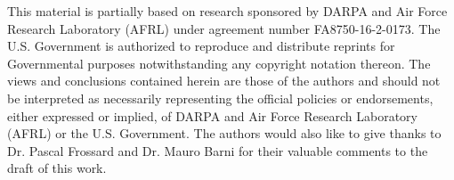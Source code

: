 \documentclass[preprint,12pt]{elsarticle}
\begin{document}
This material is partially based on research sponsored by DARPA and Air
Force Research Laboratory (AFRL) under agreement number
FA8750-16-2-0173. The U.S. Government is authorized to reproduce and
distribute reprints for Governmental purposes notwithstanding any
copyright notation thereon.  The views and conclusions contained herein
are those of the authors and should not be interpreted as necessarily
representing the official policies or endorsements, either expressed or
implied, of DARPA and Air Force Research Laboratory (AFRL) or the U.S.
Government. The authors would also like to give thanks to Dr. Pascal
Frossard and Dr. Mauro Barni for their valuable comments to the draft of
this work. 

 

\end{document}
